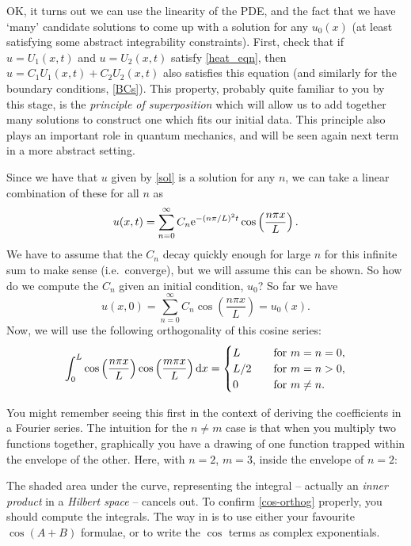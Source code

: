 \documentclass[main.tex]{subfiles}
\begin{document}
OK, it turns out we can use the linearity of the PDE, and the fact that we have `many' candidate solutions to come up with a solution for any $u_0(x)$ (at least satisfying some abstract integrability constraints). First, check that if $u = U_1(x,t)$ and $u = U_2(x,t)$ satisfy \cref{heat_eqn}, then $u = C_1U_1(x,t) + C_2U_2(x,t)$ also satisfies this equation (and similarly for the boundary conditions, \cref{BCs}). This property, probably quite familiar to you by this stage, is the \emph{principle of superposition} which will allow us to add together many solutions to construct one which fits our initial data. This principle also plays an important role in quantum mechanics, and will be seen again next term in a more abstract setting.

Since we have that $u$ given by \cref{sol} is a solution for any $n$, we can take a linear combination of these for all $n$ as
\begin{equation}\label{full_sol}
    u(x,t) = \sum_{n=0}^\infty C_n \mathrm{e}^{-(n\pi/L)^2t}\cos\left(\frac{n \pi x}{L}\right).
\end{equation}
We have to assume that the $C_n$ decay quickly enough for large $n$ for this infinite sum to make sense (i.e.\ converge), but we will assume this can be shown. So how do we compute the $C_n$ given an initial condition, $u_0$? So far we have
\begin{equation}\label{IC_eqn}
    u(x,0) = \sum_{n=0}^\infty C_n \cos\left(\frac{n \pi x}{L}\right) = u_0(x).
\end{equation}
Now, we will use the following orthogonality of this cosine series:
\begin{equation}
	\label{cos-orthog}
    \int_0^L \cos\left(\frac{n \pi x}{L}\right)\cos\left(\frac{m \pi x}{L}\right) \mathrm{d} x = \begin{cases}
    L \quad &\text{for } m = n = 0,\\
    L/2 \quad &\text{for } m=n>0,\\
    0 \quad &\text{for } m\neq n.
    \end{cases}
\end{equation}

\begin{do-it-yourself}
You might remember seeing this first in the context of deriving the coefficients in a Fourier series. The intuition for the $n\neq m$ case is that when you multiply two functions together, graphically you have a drawing of one function trapped within the envelope of the other. Here, with $n=2$, $m=3$, inside the envelope of $n=2$:

\begin{center}

\end{center}

The shaded area under the curve, representing the integral -- actually an \emph{inner product} in a \emph{Hilbert space} -- cancels out. To confirm \cref{cos-orthog} properly, you should compute the integrals. The way in is to use either your favourite $\cos(A+B)$ formulae, or to write the $\cos$ terms as complex exponentials.
\end{do-it-yourself}
\end{document}
